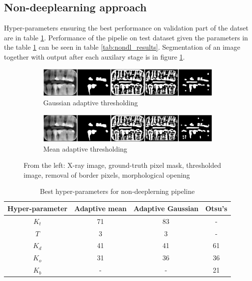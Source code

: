 \subsection{Non-deeplearning approach}
Hyper-parameters ensuring the best performance on validation part of the datset are in table \ref{tab:nondl_restorations:best_params}. Performance of the pipelie on test dataset given the parameters in the table \ref{tab:nondl_restorations:best_params} can be seen in table \ref{tab:nondl_results}. Segmentation of an image together with output after each auxilary stage is in figure \ref{fig:segmentation_sample_nondl}.

\begin{figure}[h]
    \centering
    \begin{subfigure}[b]{\textwidth}
        \includegraphics[width=1\linewidth]{images/segmentation_nondl_gauss_12.pdf}
        \caption{Gaussian adaptive thresholding}
    \end{subfigure}

    \begin{subfigure}[b]{\textwidth}
        \includegraphics[width=1\linewidth]{images/segmentation_nondl_mean_12.pdf}
        \caption{Mean adaptive thresholding}
    \end{subfigure}
    \caption{From the left: X-ray image, ground-truth pixel mask, thresholded image, removal of border pixels, morphological opening}
    \label{fig:segmentation_sample_nondl}
\end{figure}

\begin{table}[H]
    \begin{tabular}{|c|c|c|c|}
        \hline
        Hyper-parameter & Adaptive mean & Adaptive Gaussian & Otsu's \\ \hline
        $K_t$           & 71            & 83                & -      \\ \hline
        $T$             & 3             & 3                 & -      \\ \hline
        $K_d$           & 41            & 41                & 61     \\ \hline
        $K_o$           & 31            & 36                & 36     \\ \hline
        $K_b$           & -             & -                 & 21     \\ \hline
    \end{tabular}
    \caption{Best hyper-parameters for non-deeplerning pipeline}
    \label{tab:nondl_restorations:best_params}
\end{table}


